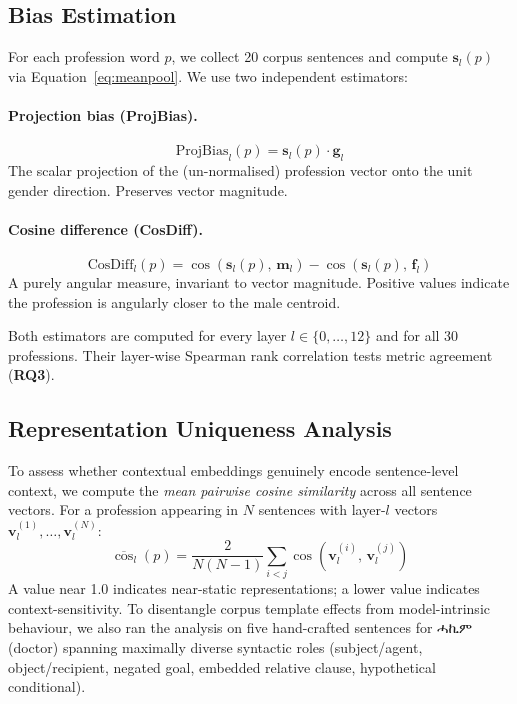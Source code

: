 \documentclass[11pt,a4paper]{article}
\begin{document}
\subsection{Bias Estimation}

For each profession word $p$, we collect 20 corpus sentences and compute
$\mathbf{s}_l(p)$ via Equation~\ref{eq:meanpool}. We use two independent
estimators:

\paragraph{Projection bias (ProjBias).}
\begin{equation}
  \text{ProjBias}_l(p) = \mathbf{s}_l(p) \cdot \mathbf{g}_l
  \label{eq:proj}
\end{equation}
The scalar projection of the (un-normalised) profession vector onto the unit
gender direction. Preserves vector magnitude.

\paragraph{Cosine difference (CosDiff).}
\begin{equation}
  \text{CosDiff}_l(p) =
    \cos\!\left(\mathbf{s}_l(p),\,\mathbf{m}_l\right) -
    \cos\!\left(\mathbf{s}_l(p),\,\mathbf{f}_l\right)
  \label{eq:cosdiff}
\end{equation}
A purely angular measure, invariant to vector magnitude. Positive values
indicate the profession is angularly closer to the male centroid.

Both estimators are computed for every layer $l \in \{0,\ldots,12\}$ and for
all 30 professions. Their layer-wise Spearman rank correlation tests metric
agreement (\textbf{RQ3}).

\subsection{Representation Uniqueness Analysis}

To assess whether contextual embeddings genuinely encode sentence-level context,
we compute the \emph{mean pairwise cosine similarity} across all sentence
vectors. For a profession appearing in $N$ sentences with layer-$l$ vectors
$\mathbf{v}^{(1)}_l, \ldots, \mathbf{v}^{(N)}_l$:
\begin{equation}
  \overline{\cos}_l(p) = \frac{2}{N(N-1)}
    \sum_{i < j} \cos\!\left(\mathbf{v}^{(i)}_l,\,\mathbf{v}^{(j)}_l\right)
\end{equation}
A value near 1.0 indicates near-static representations; a lower value indicates
context-sensitivity. To disentangle corpus template effects from model-intrinsic
behaviour, we also ran the analysis on five hand-crafted sentences for
{\ethiopicfont ሓኪም} (doctor) spanning maximally diverse syntactic roles (subject/agent,
object/recipient, negated goal, embedded relative clause, hypothetical
conditional).
\end{document}
